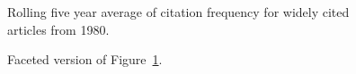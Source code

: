 \documentclass[
  10pt,
  letterpaper,
  DIV=11,
  numbers=noendperiod,
  twoside]{scrartcl}
\begin{document}
\begin{figure}


\caption{\label{fig-citation-spaghetti-1980}Rolling five year average of
citation frequency for widely cited articles from 1980.}

\end{figure}%

\begin{figure}


\caption{\label{fig-citation-facet-1980}Faceted version of
Figure~\ref{fig-citation-spaghetti-1980}.}

\end{figure}%
\end{document}
